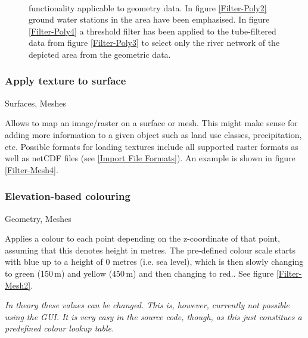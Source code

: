 \begin{figure}[tb]
\begin{center}
\enspace
{} \\
\enspace
{}
\end{center}
\caption{\ogs functionality applicable to geometry data. In figure \ref{Filter-Poly2} ground water stations in the area have been emphasised. In figure \ref{Filter-Poly4} a threshold filter has been applied to the tube-filtered data from figure \ref{Filter-Poly3} to select only the river network of the depicted area from the geometric data.} \label{fig:filter:poly}
\end{figure}

\subsubsection{Apply texture to surface}
 Surfaces, Meshes

 Allows to map an image/raster on a surface or mesh. This might make sense for adding more information to a given object such as land use classes, precipitation, etc. Possible formats for loading textures include all supported raster formats as well as netCDF files (see \ref{Import File Formats}). An example is shown in figure \ref{Filter-Mesh4}.

\subsubsection{Elevation-based colouring}
 Geometry, Meshes

 Applies a colour to each point depending on the z-coordinate of that point, assuming that this denotes height in metres. The pre-defined colour scale starts with blue up to a height of $0$ metres (i.e. sea level), which is then slowly changing to green (150\,m) and yellow (450\,m) and then changing to red.. See figure \ref{Filter-Mesh2}.

 \emph{In theory these values can be changed. This is, however, currently not possible using the GUI. It is very easy in the source code, though, as this just constitues a predefined colour lookup table.}

